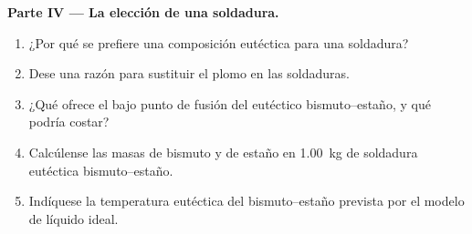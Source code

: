 \begin{problem}
\medskip
\noindent\textbf{Parte IV --- La elección de una soldadura.}
\begin{enumerate}[resume]
  \item ¿Por qué se prefiere una composición eutéctica para una soldadura?
  \item Dese una razón para sustituir el plomo en las soldaduras.
  \item ¿Qué ofrece el bajo punto de fusión del eutéctico bismuto--estaño, y
        qué podría costar?
  \item Calcúlense las masas de bismuto y de estaño en \qty{1.00}{kg} de
        soldadura eutéctica bismuto--estaño.
  \item Indíquese la temperatura eutéctica del bismuto--estaño prevista por el
        modelo de líquido ideal.
\end{enumerate}
\end{problem}
